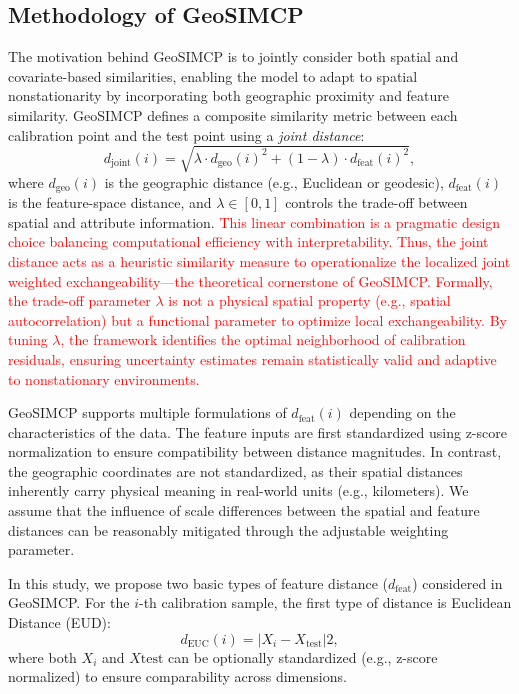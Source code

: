 \documentclass[authoryear,preprint,review,12pt]{elsarticle}
\begin{document}
\subsection{Methodology of GeoSIMCP}
\label{sec:geosimcp}


The motivation behind GeoSIMCP is to jointly consider both spatial and covariate-based similarities, enabling the model to adapt to spatial nonstationarity by incorporating both geographic proximity and feature similarity. GeoSIMCP defines a composite similarity metric between each calibration point and the test point using a \emph{joint distance}:
\begin{equation}
d_{\text{joint}}(i) = \sqrt{ \lambda \cdot d_{\text{geo}}(i)^2 + (1 - \lambda) \cdot d_{\text{feat}}(i)^2 },
\end{equation}
where $d_{\text{geo}}(i)$ is the geographic distance (e.g., Euclidean or geodesic), $d_{\text{feat}}(i)$ is the feature-space distance, and $\lambda \in [0,1]$ controls the trade-off between spatial and attribute information. \textcolor{red}{This linear combination is a pragmatic design choice balancing computational efficiency with interpretability. Thus, the joint distance acts as a heuristic similarity measure to operationalize the localized joint weighted exchangeability—the theoretical cornerstone of GeoSIMCP. Formally, the trade-off parameter $\lambda$ is not a physical spatial property (e.g., spatial autocorrelation) but a functional parameter to optimize local exchangeability. By tuning $\lambda$, the framework identifies the optimal neighborhood of calibration residuals, ensuring uncertainty estimates remain statistically valid and adaptive to nonstationary environments.}



GeoSIMCP supports multiple formulations of $d_{\text{feat}}(i)$ depending on the characteristics of the data. The feature inputs are first standardized using z-score normalization to ensure compatibility between distance magnitudes. In contrast, the geographic coordinates are not standardized, as their spatial distances inherently carry physical meaning in real-world units (e.g., kilometers). We assume that the influence of scale differences between the spatial and feature distances can be reasonably mitigated through the adjustable weighting parameter.

In this study, we propose two basic types of feature distance ($d_{\text{feat}}$) considered in GeoSIMCP. For the $i$-th calibration sample, the first type of distance is Euclidean Distance (EUD):
\begin{equation}
d_{\text{EUC}}(i)  = | X_i - X_{\text{test}} |2,
\end{equation}
where both $X_i$ and $X{\text{test}}$ can be optionally standardized (e.g., z-score normalized) to ensure comparability across dimensions.
\end{document}
